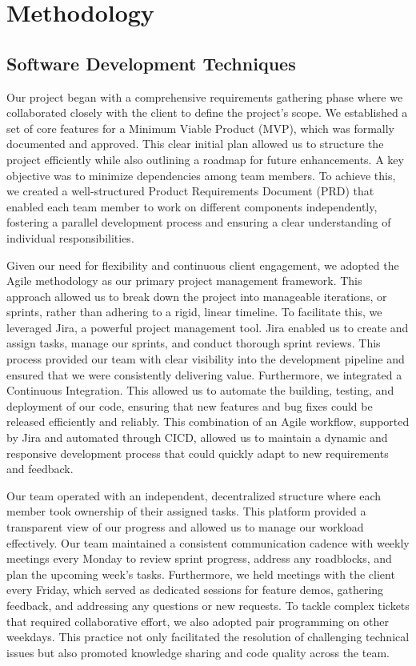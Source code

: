 
\chapter{Methodology}
\section{Software Development Techniques}
Our project began with a comprehensive requirements gathering phase where we collaborated closely with the client to define the project's scope. We established a set of core features for a Minimum Viable Product (MVP), which was formally documented and approved. This clear initial plan allowed us to structure the project efficiently while also outlining a roadmap for future enhancements. A key objective was to minimize dependencies among team members. To achieve this, we created a well-structured Product Requirements Document (PRD) that enabled each team member to work on different components independently, fostering a parallel development process and ensuring a clear understanding of individual responsibilities.

Given our need for flexibility and continuous client engagement, we adopted the Agile methodology as our primary project management framework. This approach allowed us to break down the project into manageable iterations, or sprints, rather than adhering to a rigid, linear timeline. To facilitate this, we leveraged Jira, a powerful project management tool. Jira enabled us to create and assign tasks, manage our sprints, and conduct thorough sprint reviews. This process provided our team with clear visibility into the development pipeline and ensured that we were consistently delivering value. Furthermore, we integrated a Continuous Integration. This allowed us to automate the building, testing, and deployment of our code, ensuring that new features and bug fixes could be released efficiently and reliably. This combination of an Agile workflow, supported by Jira and automated through CICD, allowed us to maintain a dynamic and responsive development process that could quickly adapt to new requirements and feedback.

Our team operated with an independent, decentralized structure where each member took ownership of their assigned tasks. This platform provided a transparent view of our progress and allowed us to manage our workload effectively. Our team maintained a consistent communication cadence with weekly meetings every Monday to review sprint progress, address any roadblocks, and plan the upcoming week's tasks. Furthermore, we held meetings with the client every Friday, which served as dedicated sessions for feature demos, gathering feedback, and addressing any questions or new requests. To tackle complex tickets that required collaborative effort, we also adopted pair programming on other weekdays. This practice not only facilitated the resolution of challenging technical issues but also promoted knowledge sharing and code quality across the team.

